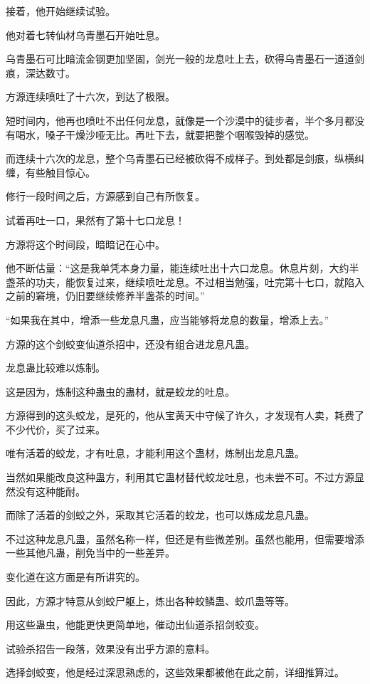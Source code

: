 \begin{this_body}
接着，他开始继续试验。

他对着七转仙材乌青墨石开始吐息。

乌青墨石可比暗流金钢更加坚固，剑光一般的龙息吐上去，砍得乌青墨石一道道剑痕，深达数寸。

方源连续喷吐了十六次，到达了极限。

短时间内，他再也喷吐不出任何龙息，就像是一个沙漠中的徒步者，半个多月都没有喝水，嗓子干燥沙哑无比。再吐下去，就要把整个咽喉毁掉的感觉。

而连续十六次的龙息，整个乌青墨石已经被砍得不成样子。到处都是剑痕，纵横纠缠，有些触目惊心。

修行一段时间之后，方源感到自己有所恢复。

试着再吐一口，果然有了第十七口龙息！

方源将这个时间段，暗暗记在心中。

他不断估量：“这是我单凭本身力量，能连续吐出十六口龙息。休息片刻，大约半盏茶的功夫，能恢复过来，继续喷吐龙息。不过相当勉强，吐完第十七口，就陷入之前的窘境，仍旧要继续修养半盏茶的时间。”

“如果我在其中，增添一些龙息凡蛊，应当能够将龙息的数量，增添上去。”

方源的这个剑蛟变仙道杀招中，还没有组合进龙息凡蛊。

龙息蛊比较难以炼制。

这是因为，炼制这种蛊虫的蛊材，就是蛟龙的吐息。

方源得到的这头蛟龙，是死的，他从宝黄天中守候了许久，才发现有人卖，耗费了不少代价，买了过来。

唯有活着的蛟龙，才有吐息，才能利用这个蛊材，炼制出龙息凡蛊。

当然如果能改良这种蛊方，利用其它蛊材替代蛟龙吐息，也未尝不可。不过方源显然没有这种能耐。

而除了活着的剑蛟之外，采取其它活着的蛟龙，也可以炼成龙息凡蛊。

不过这种龙息凡蛊，虽然名称一样，但还是有些微差别。虽然也能用，但需要增添一些其他凡蛊，削免当中的一些差异。

变化道在这方面是有所讲究的。

因此，方源才特意从剑蛟尸躯上，炼出各种蛟鳞蛊、蛟爪蛊等等。

用这些蛊虫，他能更快更简单地，催动出仙道杀招剑蛟变。

试验杀招告一段落，效果没有出乎方源的意料。

选择剑蛟变，他是经过深思熟虑的，这些效果都被他在此之前，详细推算过。


\end{this_body}
